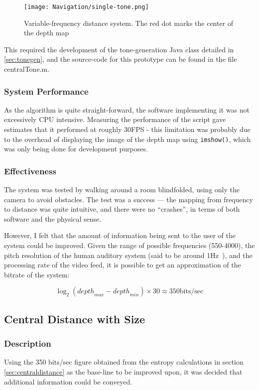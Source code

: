 \begin{figure}[H]
\centering
\texttt{[image: Navigation/single-tone.png]}
\caption{Variable-frequency distance system. The red dot marks the center of the depth map}
\end{figure}

This required the development of the tone-generation Java class detailed in \ref{sec:tonegen}, and the source-code for this prototype can be found in the file centralTone.m.

\subsubsection{System Performance}
As the algorithm is quite straight-forward, the software implementing it was not excessively CPU intensive. Measuring the performance of the script gave estimates that it performed at roughly 30FPS - this limitation was probably due to the overhead of displaying the image of the depth map using \texttt{imshow()}, which was only being done for development purposes.

\subsubsection{Effectiveness}
The system was tested by walking around a room blindfolded, using only the camera to avoid obstacles. The test was a success --- the mapping from frequency to distance was quite intuitive, and there were no ``crashes'', in terms of both software and the physical sense.

However, I felt that the amount of information being sent to the user of the system could be improved. Given the range of possible frequencies (550-4000), the pitch resolution of the human auditory system (said to be around 1Hz~\cite{pitchres}), and the processing rate of the video feed, it is possible to get an approximation of the bitrate of the system:

\begin{equation}
\log _2\left({depth}_{max} - {depth}_{min}\right) \times 30 \approx 350 \mbox{bits/sec}
\end{equation}

\subsection{Central Distance with Size}
\subsubsection{Description}
Using the 350 bits/sec figure obtained from the entropy calculations in section \ref{sec:centraldistance} as the base-line to be improved upon, it was decided that additional information could be conveyed.

